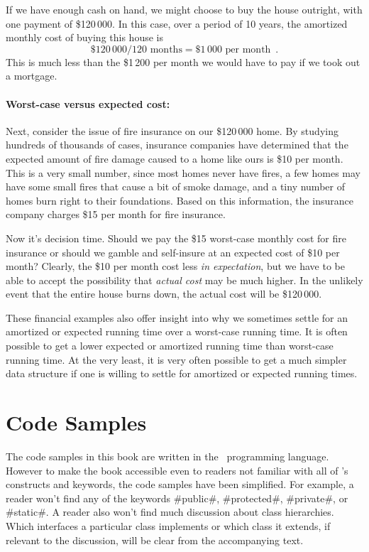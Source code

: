 If we have enough cash on hand, we might choose to buy the house outright,
with one payment of \$120\,000.  In this case, over a period of 10 years,
the amortized monthly cost of buying this house is
\[
   \$120\,000 / 120\text{ months} = \$1\,000\text{ per month} \enspace .
\]
This is much less than the \$1\,200 per month we would have to pay if
we took out a mortgage.

\paragraph{Worst-case versus expected cost:}
Next, consider the issue of fire insurance on our \$120\,000 home.
By studying hundreds of thousands of cases, insurance companies have
determined that the expected amount of fire damage caused to a home
like ours is \$10 per month.  This is a very small number, since most
homes never have fires, a few homes may have some small fires that
cause a bit of smoke damage, and a tiny number of homes burn right to
their foundations.  Based on this information, the insurance company
charges \$15 per month for fire insurance.

Now it's decision time. Should we pay the \$15 worst-case monthly cost
for fire insurance or should we gamble and self-insure at an expected
cost of \$10 per month?  Clearly, the \$10 per month cost less \emph{in
expectation}, but we have to be able to accept the possibility that
\emph{actual cost} may be much higher.  In the unlikely event that the
entire house burns down, the actual cost will be \$120\,000.

These financial examples also offer insight into why we sometimes settle
for an amortized or expected running time over a worst-case running time.
It is often possible to get a lower expected or amortized running time
than worst-case running time. At the very least, it is very often possible
to get a much simpler data structure if one is willing to settle for
amortized or expected running times.

\section{Code Samples}

The code samples in this book are written in the \lang\ programming
language.  However to make the book accessible even to readers not
familiar with all of \lang's constructs and keywords, the code samples
have been simplified.  For example, a reader won't find any of the
keywords #public#, #protected#, #private#, or #static#.  A reader also
won't find much discussion about class hierarchies.  Which interfaces
a particular class implements or which class it extends, if relevant to
the discussion, will be clear from the accompanying text.

